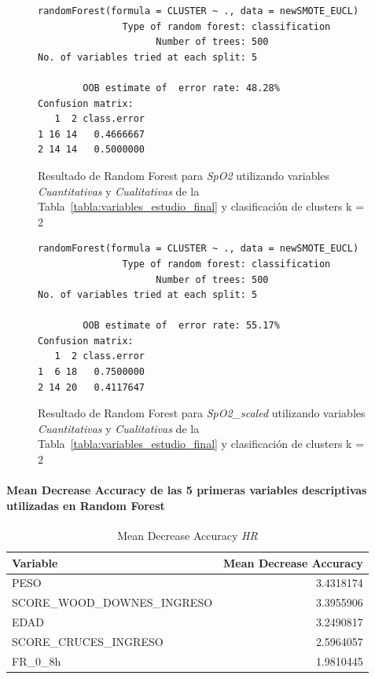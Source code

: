 \begin{figure}[H]
    \centering
    \begin{lstlisting}[frame=single, basicstyle=\small\ttfamily]
        randomForest(formula = CLUSTER ~ ., data = newSMOTE_EUCL) 
               Type of random forest: classification
                     Number of trees: 500
No. of variables tried at each split: 5

        OOB estimate of  error rate: 48.28%
Confusion matrix:
   1  2 class.error
1 16 14   0.4666667
2 14 14   0.5000000
    \end{lstlisting}
    \caption{Resultado de Random Forest para \textit{SpO2} utilizando variables \textit{Cuantitativas} y \textit{Cualitativas} de la Tabla~\ref{tabla:variables_estudio_final} y clasificación de clusters k = 2}\label{fig:random_forest_eucl_result_4}
\end{figure}
\begin{figure}[H]
    \centering
    \begin{lstlisting}[frame=single, basicstyle=\small\ttfamily]
        randomForest(formula = CLUSTER ~ ., data = newSMOTE_EUCL) 
               Type of random forest: classification
                     Number of trees: 500
No. of variables tried at each split: 5

        OOB estimate of  error rate: 55.17%
Confusion matrix:
   1  2 class.error
1  6 18   0.7500000
2 14 20   0.4117647
    \end{lstlisting}
    \caption{Resultado de Random Forest para \textit{SpO2\_scaled} utilizando variables \textit{Cuantitativas} y \textit{Cualitativas} de la Tabla~\ref{tabla:variables_estudio_final} y clasificación de clusters k = 2}
    \label{fig:random_forest_eucl_result_5}
\end{figure}

\paragraph{Mean Decrease Accuracy de las 5 primeras variables descriptivas utilizadas en Random Forest}

\begin{table}[H]
    \centering
    \begin{tabular}{lr}
        \toprule
        \textbf{Variable} & \textbf{Mean Decrease Accuracy} \\
        \midrule
        PESO & 3.4318174 \\
        SCORE\_WOOD\_DOWNES\_INGRESO & 3.3955906 \\
        EDAD & 3.2490817 \\
        SCORE\_CRUCES\_INGRESO & 2.5964057 \\
        FR\_0\_8h & 1.9810445 \\
        \bottomrule
    \end{tabular}
    \caption{Mean Decrease Accuracy \textit{HR}}
\end{table}

